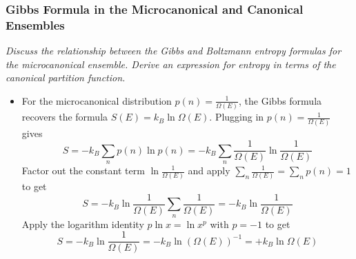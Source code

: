 \documentclass[11pt, a4paper]{article}
\begin{document}
\subsubsection{Gibbs Formula in the Microcanonical and Canonical Ensembles}
\textit{Discuss the relationship between the Gibbs and Boltzmann entropy formulas for the microcanonical ensemble. Derive an expression for entropy in terms of the canonical partition function.}
\begin{itemize}
	\item For the microcanonical distribution $ p(n) = \frac{1}{\Omega(E)} $, the Gibbs formula recovers the formula $ S(E) = k_{B} \ln \Omega (E) $. Plugging in $ p(n) = \frac{1}{\Omega(E)}$ gives
	\begin{equation*}
		S = - k_{B} \sum_{n}p(n)\ln p(n) = - k_{B} \sum_{n} \frac{1}{\Omega(E)} \ln \frac{1}{\Omega(E)}
	\end{equation*}
	Factor out the constant term $ \ln \frac{1}{\Omega(E)} $ and apply $ \sum_{n} \frac{1}{\Omega(E)} = \sum_{n}p(n) = 1 $ to get
	\begin{equation*}
		S = - k_{B} \ln \frac{1}{\Omega(E)} \sum_{n} \frac{1}{\Omega(E)} = -k_{B} \ln \frac{1}{\Omega(E)}
	\end{equation*}
	Apply the logarithm identity $ p \ln x = \ln x^{p} $ with $ p = -1 $ to get
	\begin{equation*}
		S = -k_{B} \ln \frac{1}{\Omega(E)} = - k_{B} \ln \left(\Omega(E)\right)^{-1} = + k_{B} \ln \Omega (E)
	\end{equation*}
\end{itemize}
\end{document}
